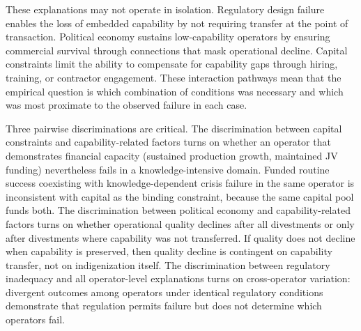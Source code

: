 \documentclass[twoside,fontset=lmodern]{mitthesis}
\begin{document}
These explanations may not operate in isolation. Regulatory design
failure enables the loss of embedded capability by not requiring
transfer at the point of transaction. Political economy sustains
low-capability operators by ensuring commercial survival through
connections that mask operational decline. Capital constraints limit the
ability to compensate for capability gaps through hiring, training, or
contractor engagement. These interaction pathways mean that the
empirical question is which combination of conditions was necessary and
which was most proximate to the observed failure in each case.

Three pairwise discriminations are critical. The discrimination between
capital constraints and capability-related factors turns on whether an
operator that demonstrates financial capacity (sustained production
growth, maintained JV funding) nevertheless fails in a
knowledge-intensive domain. Funded routine success coexisting with
knowledge-dependent crisis failure in the same operator is inconsistent
with capital as the binding constraint, because the same capital pool
funds both. The discrimination between political economy and
capability-related factors turns on whether operational quality declines
after all divestments or only after divestments where capability was not
transferred. If quality does not decline when capability is preserved,
then quality decline is contingent on capability transfer, not on
indigenization itself. The discrimination between regulatory inadequacy
and all operator-level explanations turns on cross-operator variation:
divergent outcomes among operators under identical regulatory conditions
demonstrate that regulation permits failure but does not determine which
operators fail.
\end{document}
